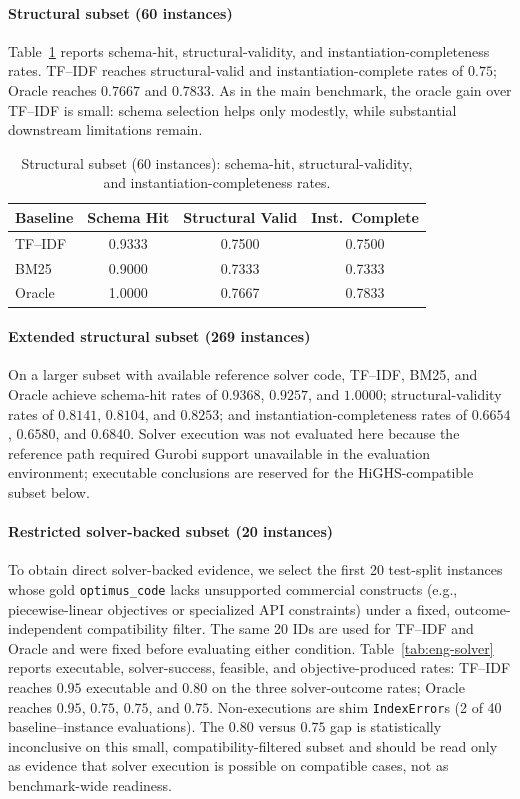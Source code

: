 \documentclass[pdflatex,sn-basic,Numbered]{sn-jnl}
\begin{document}
\paragraph{Structural subset (60 instances)}
Table~\ref{tab:eng-structural} reports schema-hit, structural-validity, and instantiation-completeness rates. TF--IDF reaches structural-valid and instantiation-complete rates of $0.75$; Oracle reaches $0.7667$ and $0.7833$. As in the main benchmark, the oracle gain over TF--IDF is small: schema selection helps only modestly, while substantial downstream limitations remain.

\begin{table}[t]
\centering
\caption{Structural subset (60 instances): schema-hit, structural-validity, and instantiation-completeness rates.}
\label{tab:eng-structural}
\small
\begin{tabular}{lccc}
  \toprule
  Baseline & Schema Hit & Structural Valid & Inst.\ Complete \\
  \midrule
  TF--IDF & 0.9333 & 0.7500 & 0.7500 \\
  BM25    & 0.9000 & 0.7333 & 0.7333 \\
  Oracle  & 1.0000 & 0.7667 & 0.7833 \\
  \bottomrule
\end{tabular}
\end{table}

\paragraph{Extended structural subset (269 instances)}
On a larger subset with available reference solver code, TF--IDF, BM25, and Oracle achieve schema-hit rates of $0.9368$, $0.9257$, and $1.0000$; structural-validity rates of $0.8141$, $0.8104$, and $0.8253$; and instantiation-completeness rates of $0.6654$, $0.6580$, and $0.6840$. Solver execution was not evaluated here because the reference path required Gurobi support unavailable in the evaluation environment; executable conclusions are reserved for the HiGHS-compatible subset below.

\paragraph{Restricted solver-backed subset (20 instances)}
To obtain direct solver-backed evidence, we select the first 20 test-split instances whose gold \texttt{optimus\_code} lacks unsupported commercial constructs (e.g., piecewise-linear objectives or specialized API constraints) under a fixed, outcome-independent compatibility filter. The same 20 IDs are used for TF--IDF and Oracle and were fixed before evaluating either condition. Table~\ref{tab:eng-solver} reports executable, solver-success, feasible, and objective-produced rates: TF--IDF reaches $0.95$ executable and $0.80$ on the three solver-outcome rates; Oracle reaches $0.95$, $0.75$, $0.75$, and $0.75$. Non-executions are shim \texttt{IndexError}s (2 of 40 baseline--instance evaluations). The $0.80$ versus $0.75$ gap is statistically inconclusive on this small, compatibility-filtered subset and should be read only as evidence that solver execution is possible on compatible cases, not as benchmark-wide readiness.
\end{document}
